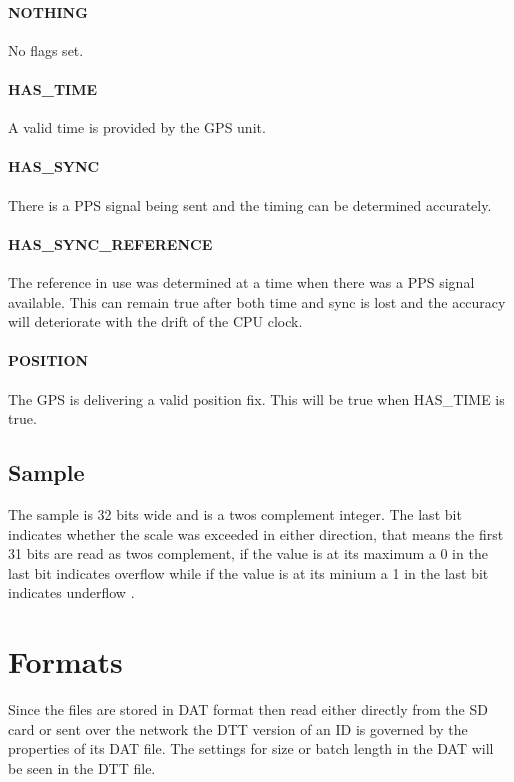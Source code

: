 \documentclass[a4paper]{article}
\begin{document}
\begin{multicols}{2}
    \paragraph{NOTHING} No flags set.

    \paragraph{HAS\_TIME} A valid time is provided by the GPS
    unit.
    \paragraph{HAS\_SYNC} There is a PPS signal being sent and the
    timing can be determined accurately.

    \paragraph{HAS\_SYNC\_REFERENCE} The reference in use was
    determined at a time when there was a PPS signal available. This can
    remain true after both time and sync is lost and the accuracy will
    deteriorate with the drift of the CPU clock.

    \paragraph{POSITION} The GPS is delivering a valid
    position fix. This will be true when HAS\_TIME is true.

    \subsection{Sample} The sample is 32 bits wide and is a twos
    complement integer. The last bit indicates whether the scale was exceeded
    in either direction, that means the first 31 bits are read as twos
    complement, if the value is at its maximum a 0 in the last bit
    indicates overflow while if the value is at its minium a 1 in the
    last bit indicates underflow \cite{ads1282_ds}.

  \section{Formats}
  Since the files are stored in DAT format then read either directly
  from the SD card or sent over the network the DTT version of an ID is
  governed by the properties of its DAT file. The settings for size or
  batch length in the DAT will be seen in the DTT file.


\end{multicols}
\end{document}
